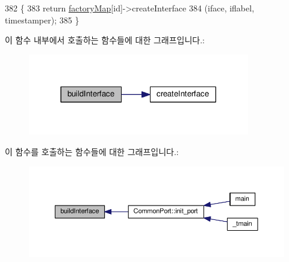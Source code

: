 \begin{DoxyCode}
382                                       \{
383         \textcolor{keywordflow}{return} \hyperlink{class_o_s_network_interface_factory_a60237a7c73ac326584618193523c9350}{factoryMap}[id]->createInterface
384             (iface, iflabel, timestamper);
385     \}
\end{DoxyCode}


이 함수 내부에서 호출하는 함수들에 대한 그래프입니다.\+:
\nopagebreak
\begin{figure}[H]
\begin{center}
\leavevmode
\includegraphics[width=273pt]{class_o_s_network_interface_factory_a459ade6d7c1a3b8688bb8f982805077d_cgraph}
\end{center}
\end{figure}




이 함수를 호출하는 함수들에 대한 그래프입니다.\+:
\nopagebreak
\begin{figure}[H]
\begin{center}
\leavevmode
\includegraphics[width=350pt]{class_o_s_network_interface_factory_a459ade6d7c1a3b8688bb8f982805077d_icgraph}
\end{center}
\end{figure}



